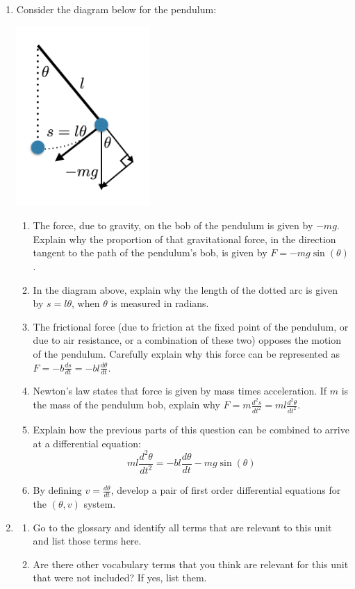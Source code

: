 \begin{enumerate}
\item Consider the diagram below for the pendulum: \label{14HWproblem5}
\begin{center}
\includegraphics[width=2in]{14/14Pendulum2.png}
\end{center}
\begin{enumerate}
\item The force, due to gravity, on the bob of the pendulum is given by $-mg$. Explain why the proportion of that gravitational force, in the direction tangent to the path of the pendulum's bob, is given by $F=-mg\sin(\theta)$. \label{14HWproblem5parta}
\item In the diagram above, explain why the length of the dotted arc is given by $s=l\theta$, when $\theta$ is measured in radians. \label{14HWproblem5partb}
\item The frictional force (due to friction at the fixed point of the pendulum, or due to air resistance, or a combination of these two) opposes the motion of the pendulum. Carefully explain why this force can be represented as $F=-b\displaystyle\frac{ds}{dt} = - bl\displaystyle\frac{d\theta}{dt}$. \label{14HWproblem5partc}
\item Newton's law states that force is given by mass times acceleration. If $m$ is the mass of the pendulum bob, explain why $F=m\displaystyle\frac{d^2s}{dt^2} = ml\displaystyle\frac{d^2\theta}{dt^2}$. \label{14HWproblem5partd}
\item Explain how the previous parts of this question can be combined to arrive at a differential equation: \label{14HWproblem5parte}
\[
ml\frac{d^2\theta}{dt^2} = -bl\frac{d\theta}{dt} - mg\sin(\theta)
\]
\item By defining $v=\displaystyle\frac{d\theta}{dt}$, develop a pair of first order differential equations for the $(\theta,v)$ system. \label{14HWproblem5partf}
\end{enumerate}

\item \label{14HWproblem6}
\begin{enumerate}
\item Go to the glossary and identify all terms that are relevant to this unit and list those terms here.
\item Are there other vocabulary terms that you think are relevant for this unit that were not included? If yes, list them.
\end{enumerate}

\end{enumerate}




